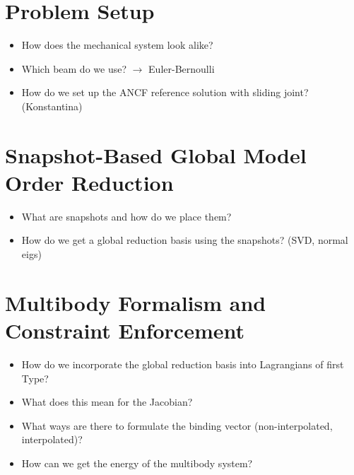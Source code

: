 \documentclass[pdflatex,sn-mathphys-num]{sn-jnl}
\newcommand{\topicSentence}[1]{{#1} \textcolor{red}{...}}
\begin{document}



\section{Problem Setup}
\label{Problem Setup}
\begin{itemize}
	\item How does the mechanical system look alike?
	\item Which beam do we use? $\rightarrow$ Euler-Bernoulli
	\item How do we set up the ANCF reference solution with sliding joint? (Konstantina)
\end{itemize}

\section{Snapshot-Based Global Model Order Reduction}
\label{Snapshot-Based Global Model Order Reduction}
\begin{itemize}
	\item What are snapshots and how do we place them?
	\item How do we get a global reduction basis using the snapshots? (SVD, normal eigs)
\end{itemize}

\section{Multibody Formalism and Constraint Enforcement}
\label{Multibody Formalism and Constraint Enforcement}
\begin{itemize}
	\item How do we incorporate the global reduction basis into Lagrangians of first Type?
	\item What does this mean for the Jacobian?
	\item What ways are there to formulate the binding vector (non-interpolated, interpolated)?
	\item How can we get the energy of the multibody system?
\end{itemize}
\end{document}
